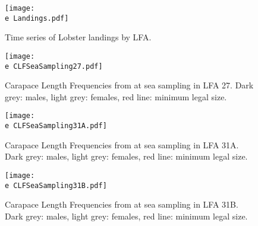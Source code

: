 \documentclass[11pt]{article}
\newcommand{\e}{\string~/bio.data/bio.lobster/figures/LFA2733Framework2018/} %
\begin{document}
%


    \begin{figure}
    \centering
        \texttt{[image: \\e Landings.pdf]}
        \caption{Time series of Lobster landings by LFA.}

    \end{figure}

    \begin{figure}
    \centering
        \texttt{[image: \\e CLFSeaSampling27.pdf]}
        \caption{Carapace Length Frequencies from at sea sampling in LFA 27. Dark grey: males, light grey: females, red line: minimum legal size.}

    \end{figure}

    \begin{figure}
    \centering
        \texttt{[image: \\e CLFSeaSampling31A.pdf]}
        \caption{Carapace Length Frequencies from at sea sampling in LFA 31A. Dark grey: males, light grey: females, red line: minimum legal size.}

    \end{figure}

    \begin{figure}
    \centering
        \texttt{[image: \\e CLFSeaSampling31B.pdf]}
        \caption{Carapace Length Frequencies from at sea sampling in LFA 31B. Dark grey: males, light grey: females, red line: minimum legal size.}

    \end{figure}
\end{document}

